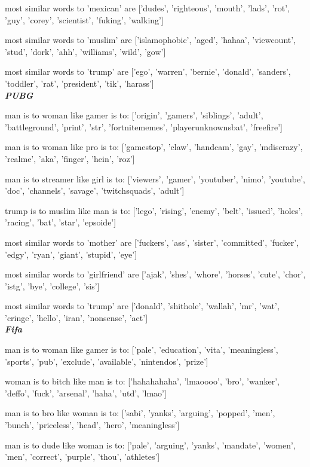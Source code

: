 most similar words to 'mexican' are ['dudes', 'righteous', 'mouth', 'lads', 'rot', 'guy', 'corey', 'scientist', 'fuking', 'walking']

most similar words to 'muslim' are ['islamophobic', 'aged', 'hahaa', 'viewcount', 'stud', 'dork', 'ahh', 'williams', 'wild', 'gow']

most similar words to 'trump' are ['ego', 'warren', 'bernie', 'donald', 'sanders', 'toddler', 'rat', 'president', 'tik', 'harass']
\\


\textbf{\emph{PUBG}}

man is to woman like gamer is to: ['origin', 'gamers', 'siblings', 'adult', 'battleground', 'print', 'str', 'fortnitememes', 'playerunknownsbat', 'freefire']

man is to woman like pro is to: ['gamestop', 'claw', 'handcam', 'gay', 'mdiscrazy', 'realme', 'aka', 'finger', 'hein', 'roz']

man is to streamer like girl is to: ['viewers', 'gamer', 'youtuber', 'nimo', 'youtube', 'doc', 'channels', 'savage', 'twitchsquads', 'adult']

trump is to muslim like man is to: ['lego', 'rising', 'enemy', 'belt', 'issued', 'holes', 'racing', 'bat', 'star', 'epsoide']

most similar words to 'mother' are ['fuckers', 'ass', 'sister', 'committed', 'fucker', 'edgy', 'ryan', 'giant', 'stupid', 'eye']

most similar words to 'girlfriend' are ['ajak', 'shes', 'whore', 'horses', 'cute', 'chor', 'istg', 'bye', 'college', 'sis']

most similar words to 'trump' are ['donald', 'shithole', 'wallah', 'mr', 'wat', 'cringe', 'hello', 'iran', 'nonsense', 'act']
\\


\textbf{\emph{Fifa}}

man is to woman like gamer is to: ['pale', 'education', 'vita', 'meaningless', 'sports', 'pub', 'exclude', 'available', 'nintendos', 'prize']

woman is to bitch like man is to: ['hahahahaha', 'lmaoooo', 'bro', 'wanker', 'deffo', 'fuck', 'arsenal', 'haha', 'utd', 'lmao']

man is to bro like woman is to: ['sabi', 'yanks', 'arguing', 'popped', 'men', 'bunch', 'priceless', 'head', 'hero', 'meaningless']

man is to dude like woman is to: ['pale', 'arguing', 'yanks', 'mandate', 'women', 'men', 'correct', 'purple', 'thou', 'athletes']

